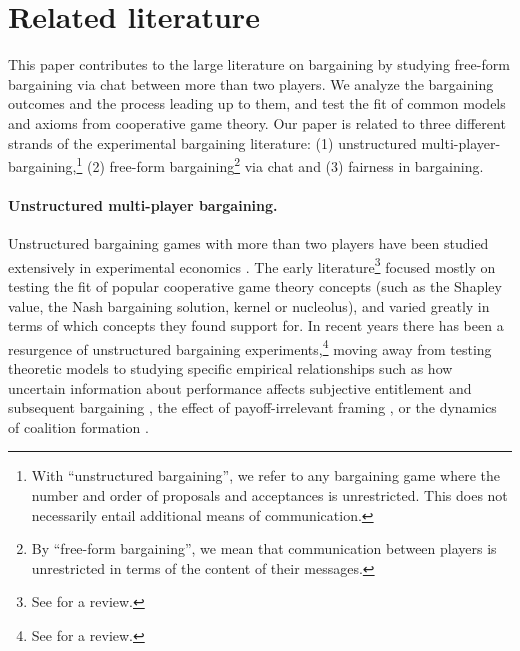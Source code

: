 
\section{Related literature} \label{sec:literature}
This paper contributes to the large literature on bargaining by studying free-form bargaining via chat between more than two players. We analyze the bargaining outcomes and the process leading up to them, and test the fit of common models and axioms from cooperative game theory. Our paper is related to three different strands of the experimental bargaining literature: (1) unstructured multi-player-bargaining,\footnote{With ``unstructured bargaining'', we refer to any bargaining game where the number and order of proposals and acceptances is unrestricted. This does not necessarily entail additional means of communication.} (2) free-form bargaining\footnote{By ``free-form bargaining'', we mean that communication between players is unrestricted in terms of the content of their messages.} via chat and (3) fairness in bargaining. 


\paragraph{Unstructured multi-player bargaining.}

Unstructured bargaining games with more than two players have been studied extensively in experimental economics \parencite[e.g.][]{Kalischetal1952, Maschler1965, NydeggerOwen1974, RapoportKahan1976, MurnighanRoth1978, Micheneretal1979, RothMalouf1979, KomoritaHamiltonKravitz1984, LeopoldWildburger1992}. The early literature\footnote{See \cite{Roth1995} for a review.} focused mostly on testing the fit of popular cooperative game theory concepts (such as the Shapley value, the Nash bargaining solution, kernel or nucleolus), and varied greatly in terms of which concepts they found support for. In recent years there has been a resurgence of unstructured bargaining experiments,\footnote{See \cite{karagozouglu2019going} for a review.} moving away from testing theoretic models to studying specific empirical relationships such as how uncertain information about performance affects subjective entitlement and subsequent bargaining \parencite{KaragözoğluRiedl2015}, the effect of payoff-irrelevant framing \parencite{Isonietal2014}, or the dynamics of coalition formation \parencite{TremewanVanberg2016}.


